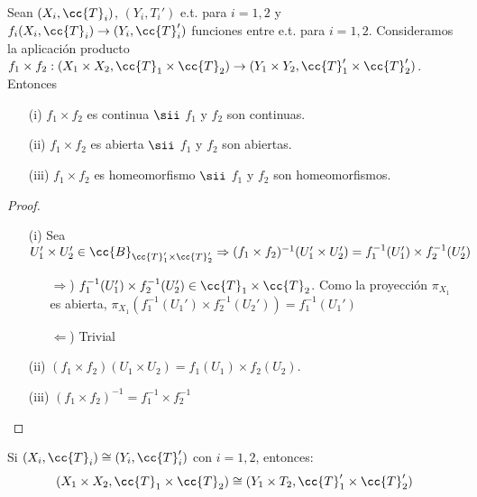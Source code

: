 \begin{prop}
    Sean $(X_i, \cc{T}_i)$, $(Y_i, T_i')$ e.t. para $i=1,2$ y $f_i(X_i, \cc{T}_i)\to (Y_i, \cc{T}_i')$ funciones entre e.t. para $i=1,2$. Consideramos la aplicación producto $f_1\times f_2:(X_1 \times X_2, \cc{T}_1 \times \cc{T}_2)\to (Y_1 \times Y_2, \cc{T}_1' \times \cc{T}_2')$. Entonces 
    \begin{enumerate}
        \item[(i)] $f_1 \times f_2$ es continua $\sii$ $f_1$ y $f_2$ son continuas.
        \item[(ii)] $f_1 \times f_2$ es abierta $\sii$ $f_1$ y $f_2$ son abiertas.
        \item[(iii)] $f_1 \times f_2$ es homeomorfismo $\sii$ $f_1$ y $f_2$ son homeomorfismos.
    \end{enumerate}
    \begin{proof}\
        \begin{enumerate}
            \item[(i)] Sea $ U_1'\times U_2 '\in \cc{B}_{\cc{T}_1'\times \cc{T}_2'} \Rightarrow (f_1 \times f_2)^{-1}(U_1'\times U_2')=f_1^{-1}(U_1')\times f_2^{-1}(U_2')$
            \begin{itemize}
                \item[$\Rightarrow$)] $f_1^{-1}(U_1') \times f_2^{-1}(U_2')\in \cc{T}_1 \times \cc{T}_2$. Como la proyección $\pi_{X_1}$ es abierta, $\pi_{X_1}(f_1^{-1}(U_1') \times f_2^{-1}(U_2'))=f_1^{-1}(U_1')$ 
                \item[$\Leftarrow$)] Trivial 
            \end{itemize}
            \item[(ii)] $(f_1 \times f_2)(U_1\times U_2)=f_1(U_1)\times f_2(U_2)$.
            \item[(iii)] $(f_1\times f_2)^{-1}=f_1^{-1}\times f_2^{-1}$ 
        \end{enumerate}
    \end{proof}
\end{prop}

\begin{coro}
    Si $(X_i, \cc{T}_i) \cong (Y_i, \cc{T}_i')$ con $i=1,2$, entonces:
    \begin{align*}
        (X_1 \times X_2, \cc{T}_1 \times \cc{T}_2) \cong (Y_1 \times T_2, \cc{T}_1'\times \cc{T}_2')
    \end{align*}
    \endsquare
\end{coro}

